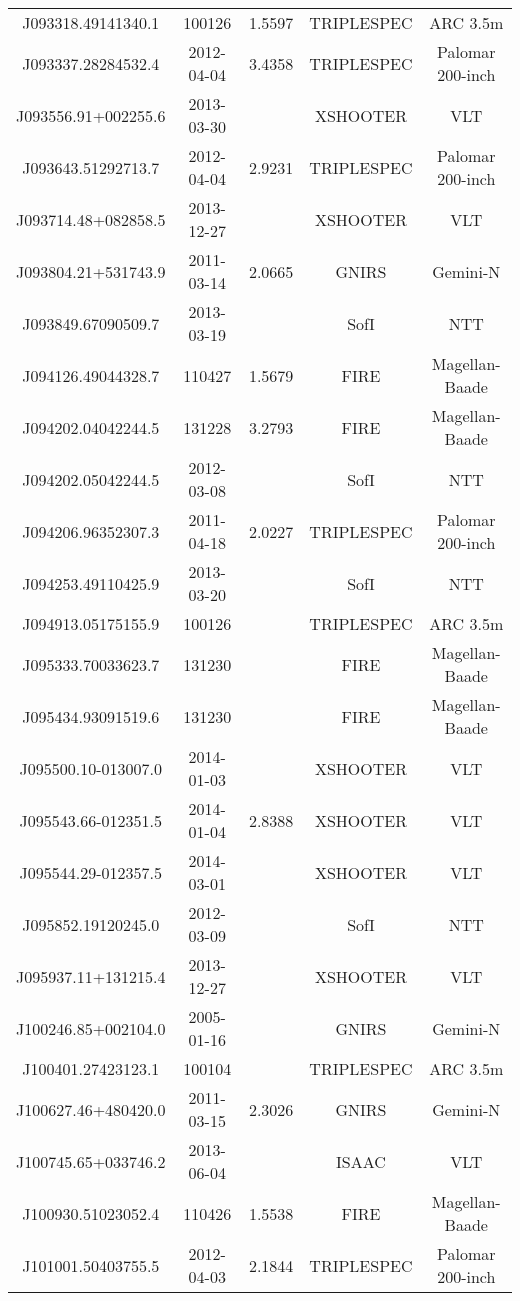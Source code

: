 {\begin{longtable}{ccccc}
J093318.49141340.1 & 100126 & 1.5597 & TRIPLESPEC & ARC 3.5m \\
J093337.28284532.4 & 2012-04-04 & 3.4358 & TRIPLESPEC & Palomar 200-inch \\
J093556.91+002255.6 & 2013-03-30 &  & XSHOOTER & VLT \\
J093643.51292713.7 & 2012-04-04 & 2.9231 & TRIPLESPEC & Palomar 200-inch \\
J093714.48+082858.5 & 2013-12-27 &  & XSHOOTER & VLT \\
J093804.21+531743.9 & 2011-03-14 & 2.0665 & GNIRS & Gemini-N \\
J093849.67090509.7 & 2013-03-19 &  & SofI & NTT \\
J094126.49044328.7 & 110427 & 1.5679 & FIRE & Magellan-Baade \\
J094202.04042244.5 & 131228 & 3.2793 & FIRE & Magellan-Baade \\
J094202.05042244.5 & 2012-03-08 &  & SofI & NTT \\
J094206.96352307.3 & 2011-04-18 & 2.0227 & TRIPLESPEC & Palomar 200-inch \\
J094253.49110425.9 & 2013-03-20 &  & SofI & NTT \\
J094913.05175155.9 & 100126 &  & TRIPLESPEC & ARC 3.5m \\
J095333.70033623.7 & 131230 &  & FIRE & Magellan-Baade \\
J095434.93091519.6 & 131230 &  & FIRE & Magellan-Baade \\
J095500.10-013007.0 & 2014-01-03 &  & XSHOOTER & VLT \\
J095543.66-012351.5 & 2014-01-04 & 2.8388 & XSHOOTER & VLT \\
J095544.29-012357.5 & 2014-03-01 &  & XSHOOTER & VLT \\
J095852.19120245.0 & 2012-03-09 &  & SofI & NTT \\
J095937.11+131215.4 & 2013-12-27 &  & XSHOOTER & VLT \\
J100246.85+002104.0 & 2005-01-16 &  & GNIRS & Gemini-N \\
J100401.27423123.1 & 100104 &  & TRIPLESPEC & ARC 3.5m \\
J100627.46+480420.0 & 2011-03-15 & 2.3026 & GNIRS & Gemini-N \\
J100745.65+033746.2 & 2013-06-04 &  & ISAAC & VLT \\
J100930.51023052.4 & 110426 & 1.5538 & FIRE & Magellan-Baade \\
J101001.50403755.5 & 2012-04-03 & 2.1844 & TRIPLESPEC & Palomar 200-inch \\

\end{longtable}}
